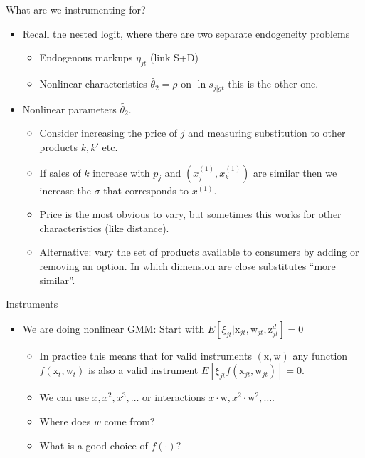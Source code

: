 \documentclass[xcolor=pdftex,dvipsnames,table,mathserif,aspectratio=169]{beamer}
\begin{document}
\begin{frame}{What are we instrumenting for?}
\begin{itemize}
\item Recall the nested logit, where there are two separate endogeneity problems
\begin{itemize}
\item Endogenous \alert{markups} $\eta_{jt}$ (link S+D)
\item \alert{Nonlinear characteristics} $\widetilde{\theta_2}=\rho$ on $\ln s_{j|gt}$ this is the other one.
\end{itemize}
\item Nonlinear parameters $\widetilde{\theta_2}$.
\begin{itemize}
\item Consider increasing the price of $j$ and measuring substitution to other products $k,k'$ etc.
\item If sales of $k$ increase with $p_j$ and $(x_j^{(1)},x_k^{(1)})$ are similar then we increase the $\sigma$ that corresponds to $x^{(1)}$.
\item Price is the most obvious to vary, but sometimes this works for other characteristics (like distance).
\item Alternative: vary the set of products available to consumers by adding or removing an option. In which dimension are close substitutes ``more similar''.
\end{itemize}
\end{itemize}
\end{frame}






\begin{frame}{Instruments}
\begin{itemize}
\item We are doing nonlinear GMM: Start with $E[\xi_{jt} | \mathrm{x}_{jt}, \mathrm{w}_{jt},\mathrm{z}_{jt}^d]=0$
\begin{itemize}
\item In practice this means that for valid instruments $(\mathrm{x},\mathrm{w})$ any function $f(\mathrm{x}_t,\mathrm{w}_t)$ is also a valid instrument $E[ \xi_{jt} f(\mathrm{x}_{jt},\mathrm{w}_{jt})]=0$.
\item We can use $x, x^2, x^3,\ldots$ or interactions $x \cdot \mathrm{w}, x^2 \cdot \mathrm{w}^2, \ldots$.
\item Where does $w$ come from?
\item What is a good choice of $f(\cdot)$?
\end{itemize}
\end{itemize}
\end{frame}
\end{document}
